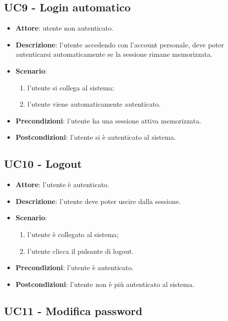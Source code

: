 \subsection{UC9 - Login automatico}
\begin{itemize}
    \item \textbf{Attore}: utente non autenticato.
    \item \textbf{Descrizione}: l'utente accedendo con l'account personale, deve poter autenticarsi automaticamente se la sessione rimane memorizzata.
    \item \textbf{Scenario}:
    \begin{enumerate}
        \item l'utente si collega al sistema;
        \item l'utente viene automaticamente autenticato.
    \end{enumerate}

    \item \textbf{Precondizioni}: l'utente ha una sessione attiva memorizzata.
    \item \textbf{Postcondizioni}: l'utente si è autenticato al sistema.
\end{itemize}

\subsection{UC10 - Logout}
\begin{itemize}
    \item \textbf{Attore}: l'utente è autenticato.
    \item \textbf{Descrizione}: l'utente deve poter uscire dalla sessione.
    \item \textbf{Scenario}:
    \begin{enumerate}
        \item l'utente è collegato al sistema;
        \item l'utente clicca il pulsante di logout.
    \end{enumerate}

    \item \textbf{Precondizioni}: l'utente è autenticato.
    \item \textbf{Postcondizioni}: l'utente non è più autenticato al sistema.
\end{itemize}

\subsection{UC11 - Modifica password}

